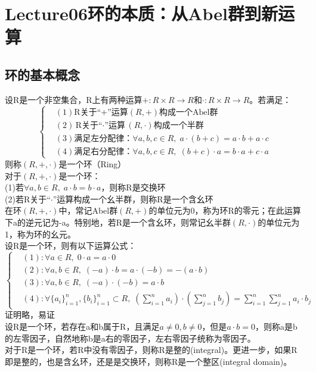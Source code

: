 \chapter*{Lecture06环的本质：从Abel群到新运算}

\section{环的基本概念}
设R是一个非空集合，R上有两种运算$+\colon R\times R\to R$和$\cdot \colon R\times R\to R$。若满足：
\[
\left\{
\begin{aligned}
&(1)\text{R关于“+”运算}(R,+)\text{构成一个Abel群}\\
&(2)\text{R关于“$\cdot$”运算}(R,\cdot)\text{构成一个半群}\\
&(3)\text{满足左分配律}：\forall a,b,c\in R,\; a\cdot(b+c)=a\cdot b+a\cdot c\\
&(4)\text{满足右分配律}：\forall a,b,c\in R,\;(b+c)\cdot a=b\cdot a+c\cdot a
\end{aligned}\right.
\]
则称$(R,+,\cdot)$是一个环（Ring）\\
对于$(R,+,\cdot)$是一个环：\\
\indent (1)若$\forall a,b\in R,\; a\cdot b=b\cdot a$，则称R是交换环\\
\indent (2)若R关于“$\cdot$”运算构成一个幺半群，则称R是一个含幺环\\
在环$(R,+,\cdot)$中，常记Abel群$(R,+)$的单位元为0，称为环R的零元；在此运算下a的逆元记为-a。特别地，若R是一个含幺环，则常记幺半群$(R,\cdot)$的单位元为1，称为环的幺元。\\
设R是一个环，则有以下运算公式：
\[
\left\{
\begin{aligned}
&(1):\forall a\in R,\; 0\cdot a=a\cdot 0\\
&(2):\forall a,b\in R,\; (-a)\cdot b=a\cdot (-b)=-(a\cdot b)\\
&(3):\forall a,b\in R,\; (-a)\cdot (-b)=a\cdot b\\
&(4):\forall \{a_i\}_{i=1}^{n},\{b_i\}_{i=1}^{n}\subset R,\; (\sum_{i=1}^{n}a_i)\cdot (\sum_{j=1}^{n}b_j)=\sum_{i=1}^{n}\sum_{j=1}^{n}a_i\cdot b_j
\end{aligned}\right.
\]
证明略，易证\\
设R是一个环，若存在a和b属于R，且满足$a\neq 0,b\neq 0$，但是$a\cdot b=0$，则称a是b的左零因子，自然地称b是a右的零因子，左右零因子统称为零因子。\\
对于R是一个环，若R中没有零因子，则称R是整的(integral)。更进一步，如果R即是整的，也是含幺环，还是是交换环，则称R是一个整区(integral domain)。\\
